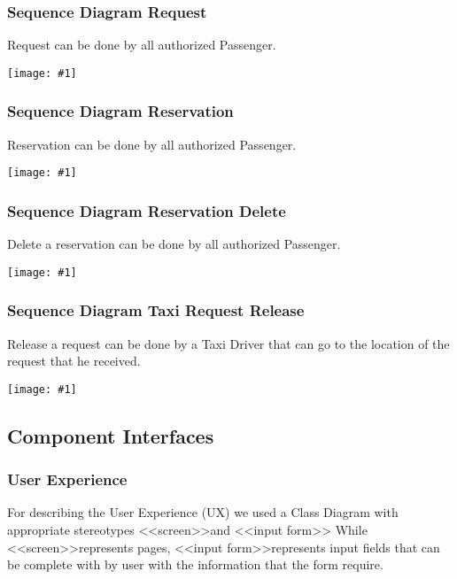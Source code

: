 \documentclass[11pt, a4paper,titlepage]{article}
\newcommand{\image}[1]{
	\begin{center}
		\noindent \texttt{[image: \#1]}
	\end{center}
	}
\begin{document}
\subsubsection{Sequence Diagram Request}
 Request can be done by all authorized Passenger.
 \image{sequenceDiagramsRequest.png}

\subsubsection{Sequence Diagram Reservation}
 Reservation can be done by all authorized Passenger.
 \image{sequenceDiagramsReservation.png}

\subsubsection{Sequence Diagram Reservation Delete}
 Delete a reservation can be done by all authorized Passenger.
 \image{sequenceDiagramsReservationDelete.png}

\subsubsection{Sequence Diagram Taxi Request Release}
 Release a request can be done by a Taxi Driver that can go to the location of the request that he received.
 \image{sequenceDiagramsTaxiRequestRelease.png}
\subsection{Component Interfaces}
	\subsubsection{User Experience}
	For describing the User Experience (UX) we used a Class Diagram with appropriate stereotypes \textless \textless screen\textgreater \textgreater  and \textless \textless input form\textgreater \textgreater 
	While \textless \textless screen\textgreater \textgreater  represents pages, \textless \textless input form\textgreater \textgreater  represents input fields that can be complete with by user with the information that the form require.
\end{document}
